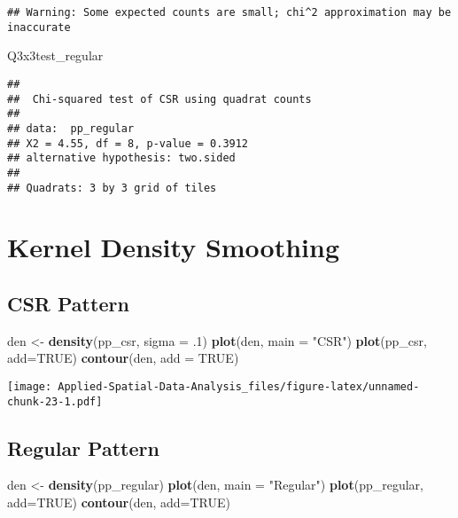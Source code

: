 \documentclass[
]{book}
\newenvironment{Shaded}{\begin{snugshade}}{\end{snugshade}}
\newcommand{\DataTypeTok}[1]{\textcolor[rgb]{0.13,0.29,0.53}{#1}}
\newcommand{\FloatTok}[1]{\textcolor[rgb]{0.00,0.00,0.81}{#1}}
\newcommand{\KeywordTok}[1]{\textcolor[rgb]{0.13,0.29,0.53}{\textbf{#1}}}
\newcommand{\NormalTok}[1]{#1}
\newcommand{\OtherTok}[1]{\textcolor[rgb]{0.56,0.35,0.01}{#1}}
\newcommand{\StringTok}[1]{\textcolor[rgb]{0.31,0.60,0.02}{#1}}
\begin{document}
\begin{verbatim}
## Warning: Some expected counts are small; chi^2 approximation may be inaccurate
\end{verbatim}

\begin{Shaded}
\begin{Highlighting}[]
\NormalTok{Q3x3test_regular}
\end{Highlighting}
\end{Shaded}

\begin{verbatim}
## 
## 	Chi-squared test of CSR using quadrat counts
## 
## data:  pp_regular
## X2 = 4.55, df = 8, p-value = 0.3912
## alternative hypothesis: two.sided
## 
## Quadrats: 3 by 3 grid of tiles
\end{verbatim}

\hypertarget{kernel-density-smoothing}{%
\section{Kernel Density Smoothing}\label{kernel-density-smoothing}}

\hypertarget{csr-pattern}{%
\subsection{CSR Pattern}\label{csr-pattern}}

\begin{Shaded}
\begin{Highlighting}[]
\NormalTok{den <-}\StringTok{ }\KeywordTok{density}\NormalTok{(pp_csr, }\DataTypeTok{sigma =} \FloatTok{.1}\NormalTok{)}
\KeywordTok{plot}\NormalTok{(den, }\DataTypeTok{main =} \StringTok{"CSR"}\NormalTok{)}
\KeywordTok{plot}\NormalTok{(pp_csr, }\DataTypeTok{add=}\OtherTok{TRUE}\NormalTok{)}
\KeywordTok{contour}\NormalTok{(den, }\DataTypeTok{add =} \OtherTok{TRUE}\NormalTok{)}
\end{Highlighting}
\end{Shaded}

\texttt{[image: Applied-Spatial-Data-Analysis\_files/figure-latex/unnamed-chunk-23-1.pdf]}

\hypertarget{regular-pattern}{%
\subsection{Regular Pattern}\label{regular-pattern}}

\begin{Shaded}
\begin{Highlighting}[]
\NormalTok{den <-}\StringTok{ }\KeywordTok{density}\NormalTok{(pp_regular)}
\KeywordTok{plot}\NormalTok{(den, }\DataTypeTok{main =} \StringTok{"Regular"}\NormalTok{)}
\KeywordTok{plot}\NormalTok{(pp_regular, }\DataTypeTok{add=}\OtherTok{TRUE}\NormalTok{)}
\KeywordTok{contour}\NormalTok{(den, }\DataTypeTok{add=}\OtherTok{TRUE}\NormalTok{)}
\end{Highlighting}
\end{Shaded}
\end{document}
